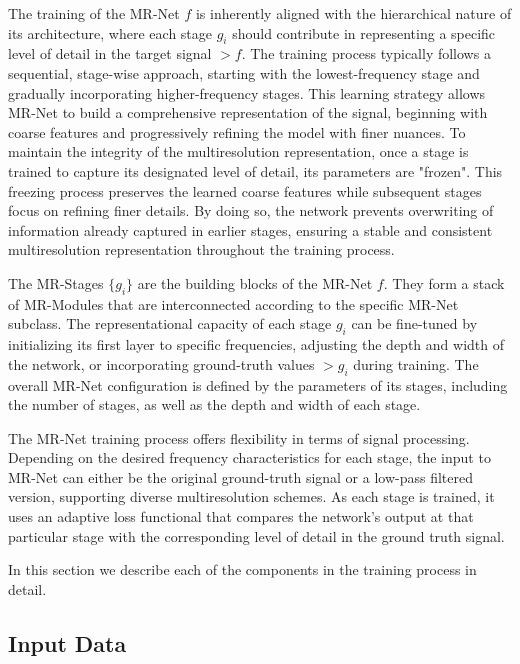 The training of the MR-Net $f$ is inherently aligned with the hierarchical nature of its architecture, where each stage $g_i$ should contribute in representing a specific level of detail in the target signal $\gt{f}$. The training process typically follows a sequential, stage-wise approach, starting with the lowest-frequency stage and gradually incorporating higher-frequency stages. This learning strategy allows MR-Net to build a comprehensive representation of the signal, beginning with coarse features and progressively refining the model with finer nuances. 
To maintain the integrity of the multiresolution representation, once a stage is trained to capture its designated level of detail, its parameters are "frozen". This freezing process preserves the learned coarse features while subsequent stages focus on refining finer details. By doing so, the network prevents overwriting of information already captured in earlier stages, ensuring a stable and consistent multiresolution representation throughout the training process.

The MR-Stages $\{g_i\}$ are the building blocks of the MR-Net $f$. They form a stack of MR-Modules that are interconnected according to the specific MR-Net subclass. The representational capacity of each stage $g_i$ can be fine-tuned by initializing its first layer to specific frequencies, adjusting the depth and width of the network, or incorporating ground-truth values $\gt{g}_i$ during training. The overall MR-Net configuration is defined by the parameters of its stages, including the number of stages, as well as the depth and width of each stage.

The MR-Net training process offers flexibility in terms of signal processing. Depending on the desired frequency characteristics for each stage, the input to MR-Net can either 
be the original ground-truth signal or a low-pass filtered version, supporting diverse multiresolution schemes. As each stage is trained, it uses an adaptive loss functional that compares the network's output at that particular stage with the corresponding level of detail in the ground truth signal.

In this section we describe each of the components in the training process in detail.

\subsection{Input Data}

